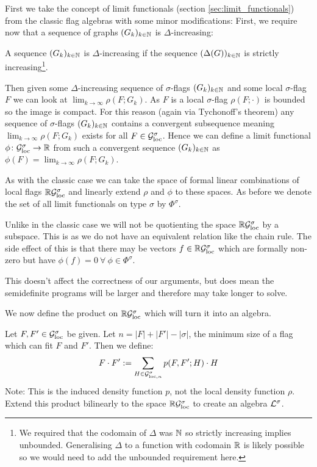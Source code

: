 First we take the concept of limit functionals (section \ref{sec:limit_functionals})
from the classic flag algebras with some minor modifications:
First, we require now that a sequence of graphs $(G_k)_{k\in\mathbb{N}}$ is $\Delta$-increasing:
\begin{definition}
    A sequence $(G_k)_{k\in\mathbb{N}}$ is $\Delta$-increasing if the sequence
    $(\Delta(G))_{k\in\mathbb{N}}$ is strictly increasing\footnote{We required that the codomain of
    $\Delta$ was $\mathbb{N}$ so strictly increasing implies unbounded. Generalising $\Delta$
    to a function with codomain $\mathbb{R}$ is likely possible so we would need to add the
    unbounded requirement here.}.
\end{definition}
Then given some $\Delta$-increasing sequence of $\sigma$-flags $(G_k)_{k\in\mathbb{N}}$
and some local $\sigma$-flag
$F$ we can look at $\lim_{k\to\infty}\rho(F; G_k)$. As $F$ is a local $\sigma$-flag
$\rho(F; \cdot)$ is bounded so the image is compact. For this reason (again via Tychonoff's theorem)
any sequence of $\sigma$-flags $(G_k)_{k\in\mathbb{N}}$ contains a convergent subsequence meaning
$\lim_{k\to\infty}\rho(F; G_k)$ exists for all $F\in\mathcal{G}_\mathrm{loc}^\sigma$.
Hence we can define a limit functional $\phi\colon\mathcal{G}_\mathrm{loc}^\sigma\to\mathbb{R}$
from such a convergent sequence $(G_k)_{k\in\mathbb{N}}$ as $\phi(F)=\lim_{k\to\infty}\rho(F; G_k)$.

As with the classic case we can take the space of formal linear combinations of
local flags $\mathbb{R}\mathcal{G}_\mathrm{loc}^\sigma$ and linearly extend $\rho$ and $\phi$ to these
spaces. As before we denote the set of all limit functionals on type $\sigma$ by
$\Phi^\sigma$.

\begin{note}
    Unlike in the classic case we will not be quotienting the space $\mathbb{R}\mathcal{G}_\mathrm{loc}^\sigma$ by
    a subspace. This is as we do not have an equivalent relation like the chain rule.
    The side effect of this is that there may be vectors $f \in \mathbb{R}\mathcal{G}_\mathrm{loc}^\sigma$ which
    are formally non-zero but have $\phi(f) = 0\ \forall\ \phi\in\Phi^\sigma$.

    This doesn't affect the correctness of our arguments, but does mean the semidefinite
    programs will be larger and therefore may take longer to solve.
\end{note}

We now define the product on $\mathbb{R}\mathcal{G}_\mathrm{loc}^\sigma$ which will turn it into an algebra.

\begin{definition}
    Let $F, F'\in\mathcal{G}_\mathrm{loc}^\sigma$ be given. Let $n=|F|+|F'|-|\sigma|$, the minimum size of
    a flag which can fit $F$ and $F'$. Then we define:
    \[
        F \cdot F' := \sum_{H \in \mathcal{G}_{\mathrm{loc},n}^\sigma} p(F, F'; H) \cdot H
    \]
    Note: This is the induced density function $p$, not the local density function $\rho$.
    Extend this product bilinearly to the space $\mathbb{R}\mathcal{G}_\mathrm{loc}^\sigma$ to create an algebra
    $\mathcal{L}^\sigma$.
\end{definition}

